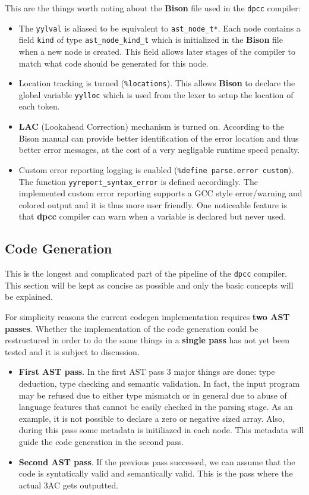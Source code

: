 \documentclass[a4paper]{article}
\begin{document}
This are the things worth noting about the \textbf{Bison} file used in the \texttt{dpcc} compiler:

\begin{itemize}
\item The \texttt{yylval} is aliased to be equivalent to \texttt{ast\_node\_t*}. Each node contains a field \texttt{kind} of type \texttt{ast\_node\_kind\_t}
  which is initialized in the \textbf{Bison} file when a new node is created. This field allows later
  stages of the compiler to match what code should be generated for this node.
\item Location tracking is turned (\texttt{\%locations}). This allows \textbf{Bison} to declare the global variable \texttt{yylloc}
  which is used from the lexer to setup the location of each token.
\item \textbf{LAC} (Lookahead Correction) mechanism is turned on. According to the Bison manual can provide
  better identification of the error location and thus better error messages, at the cost of a very negligable runtime speed penalty.
\item Custom error reporting logging is enabled (\texttt{\%define parse.error custom}). The function
  \texttt{yyreport\_syntax\_error}
  is defined accordingly. The implemented custom error reporting
  supports a GCC style error/warning and colored output and it is thus more user friendly. One noticeable feature is that \textbf{dpcc} compiler can warn when a variable is declared but never used.
\end{itemize}



\subsection{Code Generation}

This is the longest and complicated part of the pipeline of the \texttt{dpcc} compiler.
This section will be kept as concise as possible and only the basic concepts will be explained.

For simplicity reasons the current codegen implementation requires \textbf{two AST passes}. Whether
the implementation of the code generation could be restructured in order to do the same things
in a \textbf{single pass} has not yet been tested and it is subject to discussion.


\begin{itemize}
\item \textbf{First AST pass}. In the first AST pass 3 major things are done: type deduction, type checking and semantic validation.
  In fact, the input program may be refused due to either type mismatch or in general due to abuse of language features that cannot
  be easily checked in the parsing stage. As an example, it is not possible to declare a zero or negative sized array.
  Also, during this pass some metadata is initiliazed in each node. This metadata will guide the code generation in the second pass.
\item \textbf{Second AST pass}. If the previous pass successed, we can assume that the code is syntatically valid and semantically valid. This is the pass where the actual 3AC gets outputted.
\end{itemize}
\end{document}
